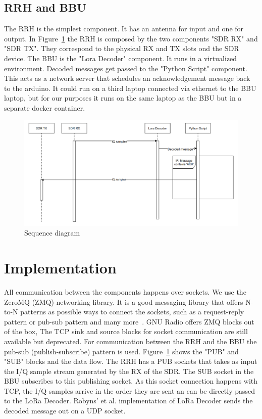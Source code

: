 \subsection{RRH and BBU}
The RRH is the simplest component. It has an antenna for input and one for output. In Figure~\ref{fig:seq_diagram} the RRH is composed by the two 
components "SDR RX" and "SDR TX". They correspond to the physical RX and TX slots ond the SDR device. The BBU is the "Lora Decoder" component. It runs 
in a virtualized environment. Decoded messages get passed to the "Python Script" component. This acts as a network server that schedules an acknowledgement
message back to the arduino. It could run on a third laptop connected via ethernet to the BBU laptop, but for our purposes it runs on the same laptop
as the BBU but in a separate docker container.
\begin{figure}[h]
    \centering
    \includegraphics[width=1\textwidth]{figures/seq_diagram.png}
    \caption{Sequence diagram}
    \label{fig:seq_diagram}
\end{figure}


\section{Implementation}
All communication between the components happens over sockets. We use the ZeroMQ (ZMQ) networking library.
It is a good messaging library that offers N-to-N patterns as possible ways to connect the sockets, such as a request-reply pattern
or pub-sub pattern and many more~\cite{zeromq}.
GNU Radio offers ZMQ blocks out of the box, The TCP sink and source blocks for socket communication are still available but deprecated. 
For communication between the RRH and the BBU the pub-sub (publish-subscribe) pattern is used.
Figure~\ref{fig:seq_diagram} shows the "PUB" and "SUB" blocks and the data flow.
The RRH has a PUB sockets that takes as input the I/Q sample stream generated by the RX of the SDR.
The SUB socket in the BBU subscribes to this publishing socket. As this socket connection happens with TCP, the I/Q samples arrive in the order
they are sent an can be directly passed to the LoRa Decoder. Robyns' et al. implementation of LoRa Decoder sends the decoded message 
out on a UDP socket.  


